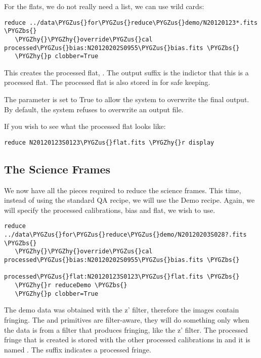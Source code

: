 \documentclass[letterpaper,10pt,english]{sphinxmanual}
\def\PYGZbs{\char`\\}
\def\PYGZus{\char`\_}
\def\PYGZhy{\char`\-}
\begin{document}
For the flats, we do not really need a list, we can use wild cards:

\begin{Verbatim}[commandchars=\\\{\}]
reduce ../data\PYGZus{}for\PYGZus{}reduce\PYGZus{}demo/N20120123*.fits \PYGZbs{}
   \PYGZhy{}\PYGZhy{}override\PYGZus{}cal processed\PYGZus{}bias:N20120202S0955\PYGZus{}bias.fits \PYGZbs{}
   \PYGZhy{}p clobber=True
\end{Verbatim}

This creates the processed flat, .  The output suffix
 is the indictor that this is a processed flat.  The processed flat is also
stored in  for safe keeping.

The  parameter is set to True to allow the system to overwrite the final
output.  By default, the system refuses to overwrite an output file.

If you wish to see what the processed flat looks like:

\begin{Verbatim}[commandchars=\\\{\}]
reduce N20120123S0123\PYGZus{}flat.fits \PYGZhy{}r display
\end{Verbatim}


\subsection{The Science Frames}
\label{appendices/appendix_demo:the-science-frames}
We now have all the pieces required to reduce the science frames.  This time,
instead of using the standard QA recipe, we will use the Demo recipe.  Again,
we will specify the processed calibrations, bias and flat, we wish to use.

\begin{Verbatim}[commandchars=\\\{\}]
reduce ../data\PYGZus{}for\PYGZus{}reduce\PYGZus{}demo/N20120203S028?.fits \PYGZbs{}
   \PYGZhy{}\PYGZhy{}override\PYGZus{}cal processed\PYGZus{}bias:N20120202S0955\PYGZus{}bias.fits \PYGZbs{}
                  processed\PYGZus{}flat:N20120123S0123\PYGZus{}flat.fits \PYGZbs{}
   \PYGZhy{}r reduceDemo \PYGZbs{}
   \PYGZhy{}p clobber=True
\end{Verbatim}

The demo data was obtained with the z' filter, therefore the images contain fringing.
The  and  primitives are filter-aware, they will do
something only when the data is from a filter that produces fringing, like the z'
filter.  The processed fringe that is created is stored with the other processed
calibrations in  and it is named .
The  suffix indicates a processed fringe.
\end{document}
